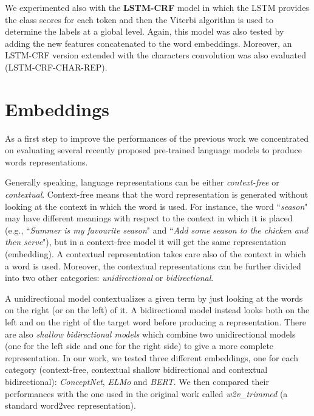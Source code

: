 \documentclass[11pt,a4paper]{article}
\begin{document}
We experimented also with the \textbf{LSTM-CRF} model \cite{
yao2014recurrent, DBLP:journals/corr/HuangXY15} in 
which the LSTM provides the class scores for each 
token and then the Viterbi algorithm is used to 
determine the labels at a global level.  Again, this 
model was also tested by adding the new features 
concatenated to the word embeddings. Moreover, an 
LSTM-CRF version extended with the characters 
convolution was also evaluated (LSTM-CRF-CHAR-REP).

\section{Embeddings}

As a first step to improve the performances of the previous work we concentrated on evaluating several recently proposed pre-trained language models to produce words representations.

Generally speaking, language representations can be either \textit{context-free} or \textit{contextual}. 
Context-free means that the word representation is generated without looking at the context in which the word is used. For instance, the word ``\textit{season}" may have different meanings with respect to the context in which it is placed (e.g., ``\textit{Summer is my favourite season}" and ``\textit{Add some season to the chicken and then serve}"), but in a context-free model it will get the same representation (embedding). A contextual representation takes care also of the context in which a word is used.
Moreover, the contextual representations can be further divided into two other categories: \textit{unidirectional} or \textit{bidirectional}. 

A unidirectional model contextualizes a given term by just looking at the words on the right (or on the left) of it.  A bidirectional model instead looks both on the left and on the right of the target word before producing a representation. There are also \textit{shallow bidirectional models} which combine two unidirectional models (one for the left side and one for the right side) to give a more complete representation. In our work, we tested three different embeddings, one for each category (context-free, contextual shallow bidirectional and contextual bidirectional): \textit{ConceptNet}, \textit{ELMo} and \textit{BERT}. We then compared their performances with the one used in the original work called \textit{w2v\_trimmed} (a standard word2vec representation).
\end{document}
